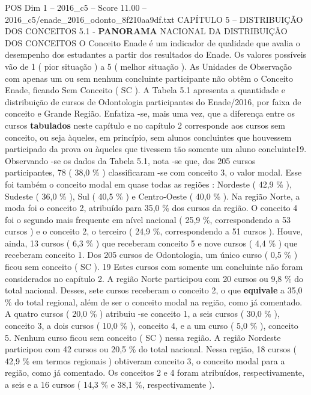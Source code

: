 \begin{textsample}{POS Dim 1 – 2016\_c5 – Score 11.00 – 2016\_c5/enade\_2016\_odonto\_8f210aa9df.txt}  \label{ex:f1_pos_072}
CAPÍTULO 5 – DISTRIBUIÇÃO DOS CONCEITOS 5.1 - \textbf{PANORAMA} NACIONAL DA DISTRIBUIÇÃO DOS CONCEITOS O Conceito Enade é um indicador de qualidade que avalia o desempenho dos estudantes a partir dos resultados do Enade.
Os valores possíveis vão de 1 ( pior situação ) a 5 ( melhor situação ).
As Unidades de Observação com apenas um ou sem nenhum concluinte participante não obtêm o Conceito Enade, ficando Sem Conceito ( SC ).
A Tabela 5.1 apresenta a quantidade e distribuição de cursos de Odontologia participantes do Enade/2016, por faixa de conceito e Grande Região.
Enfatiza -se, mais uma vez, que a diferença entre os cursos \textbf{tabulados} neste capítulo e no capítulo 2 corresponde aos cursos sem conceito, ou seja àqueles, em princípio, sem alunos concluintes que houvessem participado da prova ou àqueles que tivessem tão somente um aluno concluinte19.
Observando -se os dados da Tabela 5.1, nota -se que, dos 205 cursos participantes, 78 ( 38,0 \% ) classificaram -se com conceito 3, o valor modal.
Esse foi também o conceito modal em quase todas as regiões : Nordeste ( 42,9 \% ), Sudeste ( 36,0 \% ), Sul ( 40,5 \% ) e Centro-Oeste ( 40,0 \% ).
Na região Norte, a moda foi o conceito 2, atribuído para 35,0 \% dos cursos da região.
O conceito 4 foi o segundo mais frequente em nível nacional ( 25,9 \%, correspondendo a 53 cursos ) e o conceito 2, o terceiro ( 24,9 \%, correspondendo a 51 cursos ).
Houve, ainda, 13 cursos ( 6,3 \% ) que receberam conceito 5 e nove cursos ( 4,4 \% ) que receberam conceito 1.
Dos 205 cursos de Odontologia, um único curso ( 0,5 \% ) ficou sem conceito ( SC ). 19 Estes cursos com somente um concluinte não foram considerados no capítulo 2.
A região Norte participou com 20 cursos ou 9,8 \% do total nacional.
Desses, sete cursos receberam o conceito 2, o que \textbf{equivale} a 35,0 \% do total regional, além de ser o conceito modal na região, como já comentado.
A quatro cursos ( 20,0 \% ) atribuiu -se conceito 1, a seis cursos ( 30,0 \% ), conceito 3, a dois cursos ( 10,0 \% ), conceito 4, e a um curso ( 5,0 \% ), conceito 5.
Nenhum curso ficou sem conceito ( SC ) nessa região.
A região Nordeste participou com 42 cursos ou 20,5 \% do total nacional.
Nessa região, 18 cursos ( 42,9 \% em termos regionais ) obtiveram conceito 3, o conceito modal para a região, como já comentado.
Os conceitos 2 e 4 foram atribuídos, respectivamente, a seis e a 16 cursos ( 14,3 \% e 38,1 \%, respectivamente ).

\end{textsample}
